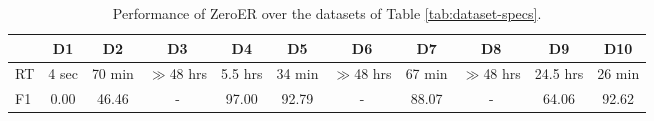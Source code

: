 \begin{table*}[t]
\centering
\setlength{\tabcolsep}{1.4pt}
\caption{Performance of ZeroER over the datasets of Table \ref{tab:dataset-specs}.}
\label{tab:zeroer-results}
\begin{tabular}{|l|c|c|c|c|c|c|c|c|c|c|}
\cline{2-11}
\multicolumn{1}{c|}{} & D1 & D2 & D3 & D4 & D5 & D6 & D7 & D8 & D9 & D10 \\
\hline
\hline
RT & 4 sec & 70 min & $\gg$48 hrs & 5.5 hrs & 34 min & $\gg$48 hrs & 67 min & $\gg$48 hrs & 24.5 hrs & 26 min \\
F1 & 0.00 & 46.46 & - & 97.00 & 92.79 & - & 88.07 & - & 64.06 & 92.62 \\
\hline
\end{tabular}
\end{table*}